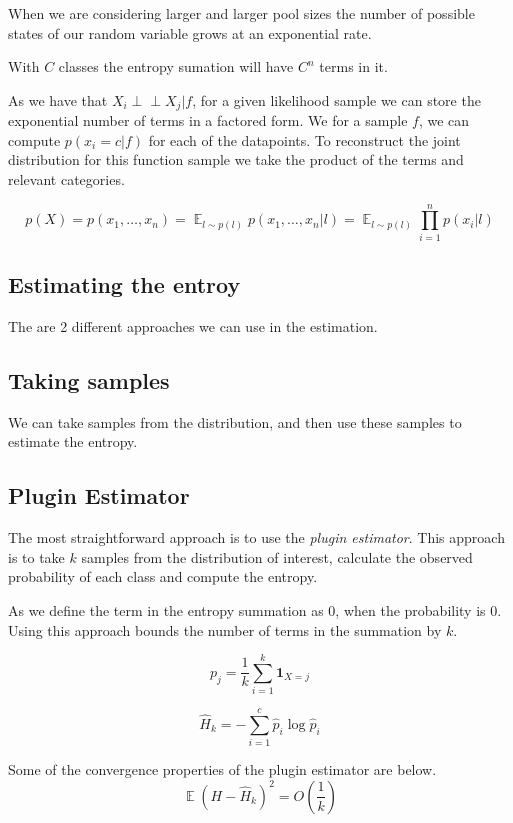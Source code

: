 \documentclass[12pt, a4paper]{report}
\theoremstyle{definition}
\DeclareMathOperator{\E}{\mathbb{E}}
\begin{document}
When we are considering larger and larger pool sizes the number of possible states of our random variable grows at an exponential rate.

With $C$ classes the entropy sumation will have $C^n$ terms in it. 

As we have that $ X_i \perp\!\!\!\perp X_j | f$, for a given likelihood sample we can store the exponential number of terms in a factored form. We for a sample $f$, we can compute $p(x_i = c | f)$ for each of the datapoints. To reconstruct the joint distribution for this function sample we take the product of the terms and relevant categories.


$$ p(X) = p(x_1, \ldots, x_n) = \E_{l \sim p(l)}  p(x_1, \ldots, x_n | l) = \E_{l \sim p(l)} \prod_{i=1}^n  p(x_i| l)$$

\subsection{Estimating the entroy}

The are 2 different approaches we can use in the estimation.

\subsection{Taking samples}

We can take samples from the distribution, and then use these samples to estimate the entropy.



\subsection{Plugin Estimator}
The most straightforward approach is to use the \textit{plugin estimator}. This approach is to take $k$ samples from the distribution of interest, calculate the observed probability of each class and compute the entropy.

As we define the term in the entropy summation as $0$, when the probability is $0$. Using this approach bounds the number of terms in the summation by $k$.

$$p_j = \frac{1}{k} \sum_{i=1}^k \mathbf{1}_{X = j} $$

$$\hat{H}_k = - \sum_{i=1}^{c} \hat{p}_i \log{\hat{p}_i}$$


Some of the convergence properties of the plugin estimator are below.
$$\E \left(H - \hat{H}_k \right)^2 = O \left ( \frac{1}{k} \right) $$
\end{document}
